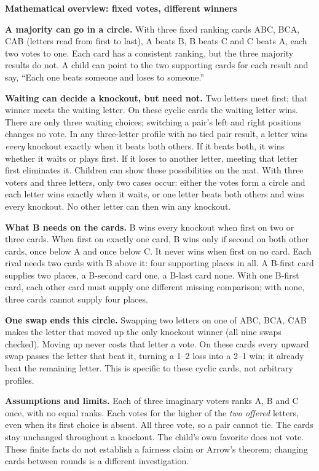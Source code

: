 \documentclass[11pt]{article}
\newcommand{\head}[1]{\par\textbf{\large #1}\par}
\begin{document}
\head{Mathematical overview: fixed votes, different winners}
\textbf{A majority can go in a circle.} With three fixed ranking cards ABC, BCA, CAB (letters read from first to last), A beats B, B beats C and C beats A, each two votes to one. Each card has a consistent ranking, but the three majority results do not. A child can point to the two supporting cards for each result and say, ``Each one beats someone and loses to someone.''

\textbf{Waiting can decide a knockout, but need not.} Two letters meet first; that winner meets the waiting letter. On these cyclic cards the waiting letter wins. There are only three waiting choices; switching a pair's left and right positions changes no vote. In any three-letter profile with no tied pair result, a letter wins \emph{every} knockout exactly when it beats both others. If it beats both, it wins whether it waits or plays first. If it loses to another letter, meeting that letter first eliminates it. Children can show these possibilities on the mat. With three voters and three letters, only two cases occur: either the votes form a circle and each letter wins exactly when it waits, or one letter beats both others and wins every knockout. No other letter can then win any knockout.

\textbf{What B needs on the cards.} B wins every knockout when first on two or three cards. When first on exactly one card, B wins only if second on both other cards, once below A and once below C. It never wins when first on no card. Each rival needs two cards with B above it: four supporting places in all. A B-first card supplies two places, a B-second card one, a B-last card none. With one B-first card, each other card must supply one different missing comparison; with none, three cards cannot supply four places.

\textbf{One swap ends this circle.} Swapping two letters on one of ABC, BCA, CAB makes the letter that moved up the only knockout winner (all nine swaps checked). Moving up never costs that letter a vote. On these cards every upward swap passes the letter that beat it, turning a 1--2 loss into a 2--1 win; it already beat the remaining letter. This is specific to these cyclic cards, not arbitrary profiles.

\textbf{Assumptions and limits.} Each of three imaginary voters ranks A, B and C once, with no equal ranks. Each votes for the higher of the \emph{two offered} letters, even when its first choice is absent. All three vote, so a pair cannot tie. The cards stay unchanged throughout a knockout. The child's own favorite does not vote. These finite facts do not establish a fairness claim or Arrow's theorem; changing cards between rounds is a different investigation.
\end{document}
